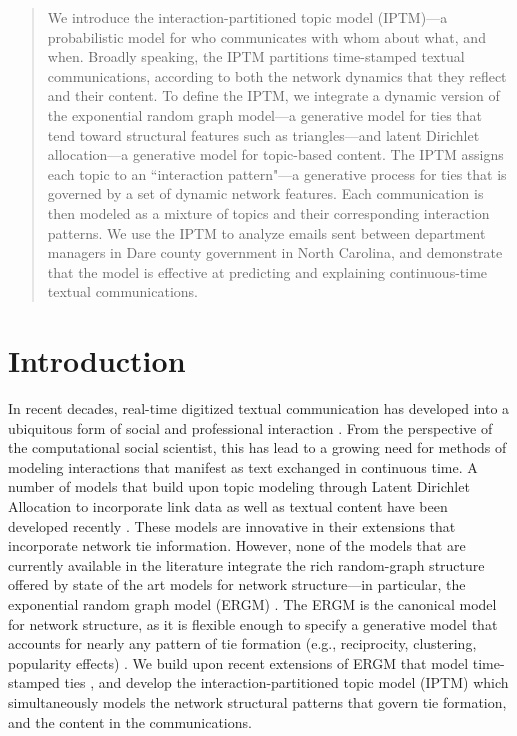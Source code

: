 \documentclass{article}
\begin{document}
\printAffiliationsAndNotice{\icmlEqualContribution} %

\begin{abstract}
We introduce the interaction-partitioned topic model
(IPTM)---a probabilistic model for who communicates with whom about what, and when. Broadly speaking, the IPTM partitions time-stamped textual communications, according to both the network
dynamics that they reflect and their content. To define the IPTM, we
integrate a dynamic version of the exponential random graph model---a generative model for ties that tend toward structural features such as triangles---and latent Dirichlet allocation---a generative model for topic-based content.
The IPTM assigns each topic to an ``interaction
pattern"---a generative process for ties that is governed by a set of
dynamic network features. Each communication is then modeled as a
mixture of topics and their corresponding interaction patterns. We use
the IPTM to analyze emails sent between department managers in Dare
county government in North Carolina, and demonstrate that the model is effective
at predicting and explaining continuous-time textual communications.
\end{abstract}

\section{Introduction}
\label{Introduction}
In recent decades, real-time digitized textual communication has developed into a ubiquitous form of social and professional interaction \cite{kanungo2008modeling, szostek2011dealing, burgess2004email, pew2016}. From the perspective of the computational social scientist, this has lead to a growing need for methods of modeling interactions that manifest as text exchanged in continuous time. A number of models that build upon topic modeling through Latent Dirichlet Allocation \cite{Blei2003} to incorporate link data as well as textual content have been developed recently \cite{mccallum2005author,lim2013twitter,Krafft2012}. These models are innovative in their extensions that incorporate network tie information. However, none of the models that are currently available in the literature integrate the rich random-graph structure offered by state of the art models for network structure---in particular, the exponential random graph model (ERGM) \cite{robins2007introduction,chatterjee2013estimating,hunter2008ergm}. The ERGM is the canonical model for network structure, as it is flexible enough to specify a generative model that accounts for nearly any pattern of tie formation (e.g., reciprocity, clustering, popularity effects) \cite{desmarais2017statistical}. We build upon recent extensions of ERGM that model time-stamped ties \cite{PerryWolfe2012,Butts2008}, and develop the interaction-partitioned topic model (IPTM) which simultaneously models the network structural patterns that govern tie formation, and the content in the communications.
\end{document}
